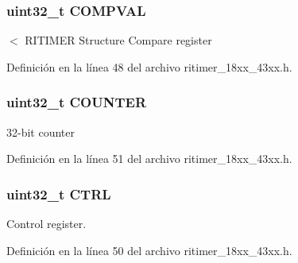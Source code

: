 \subsubsection[{\texorpdfstring{C\+O\+M\+P\+V\+AL}{COMPVAL}}]{ uint32\+\_\+t C\+O\+M\+P\+V\+AL}\hypertarget{struct_l_p_c___r_i_t_i_m_e_r___t_a023c39aa448e237129eaadeb8203cc88}{}\label{struct_l_p_c___r_i_t_i_m_e_r___t_a023c39aa448e237129eaadeb8203cc88}
$<$ R\+I\+T\+I\+M\+ER Structure Compare register 

Definición en la línea 48 del archivo ritimer\+\_\+18xx\+\_\+43xx.\+h.

\subsubsection[{\texorpdfstring{C\+O\+U\+N\+T\+ER}{COUNTER}}]{ uint32\+\_\+t C\+O\+U\+N\+T\+ER}\hypertarget{struct_l_p_c___r_i_t_i_m_e_r___t_a55977865c315a9e732b833af88b4dca0}{}\label{struct_l_p_c___r_i_t_i_m_e_r___t_a55977865c315a9e732b833af88b4dca0}
32-\/bit counter 

Definición en la línea 51 del archivo ritimer\+\_\+18xx\+\_\+43xx.\+h.

\subsubsection[{\texorpdfstring{C\+T\+RL}{CTRL}}]{ uint32\+\_\+t C\+T\+RL}\hypertarget{struct_l_p_c___r_i_t_i_m_e_r___t_a15fc8d35f045f329b80c544bef35ff64}{}\label{struct_l_p_c___r_i_t_i_m_e_r___t_a15fc8d35f045f329b80c544bef35ff64}
Control register. 

Definición en la línea 50 del archivo ritimer\+\_\+18xx\+\_\+43xx.\+h.

